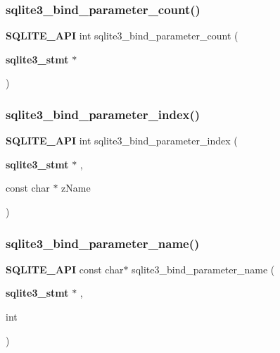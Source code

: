 \subsubsection{sqlite3\_bind\_parameter\_count()}
{\footnotesize\ttfamily \textbf{ S\+Q\+L\+I\+T\+E\+\_\+\+A\+PI} int sqlite3\+\_\+bind\+\_\+parameter\+\_\+count (\begin{DoxyParamCaption}\item[{\textbf{ sqlite3\+\_\+stmt} $\ast$}]{ }\end{DoxyParamCaption})}

\mbox{\label{sqlite3_8h_a4444032ba0151c38d413119f6a52f96e}} 
\subsubsection{sqlite3\_bind\_parameter\_index()}
{\footnotesize\ttfamily \textbf{ S\+Q\+L\+I\+T\+E\+\_\+\+A\+PI} int sqlite3\+\_\+bind\+\_\+parameter\+\_\+index (\begin{DoxyParamCaption}\item[{\textbf{ sqlite3\+\_\+stmt} $\ast$}]{,  }\item[{const char $\ast$}]{z\+Name }\end{DoxyParamCaption})}

\mbox{\label{sqlite3_8h_a5e2eedb0688d30997d0b8f918472d58c}} 
\subsubsection{sqlite3\_bind\_parameter\_name()}
{\footnotesize\ttfamily \textbf{ S\+Q\+L\+I\+T\+E\+\_\+\+A\+PI} const char$\ast$ sqlite3\+\_\+bind\+\_\+parameter\+\_\+name (\begin{DoxyParamCaption}\item[{\textbf{ sqlite3\+\_\+stmt} $\ast$}]{,  }\item[{int}]{ }\end{DoxyParamCaption})}

\mbox{\label{sqlite3_8h_a035a631b95ff80163b62aacd2fb9e880}} 
